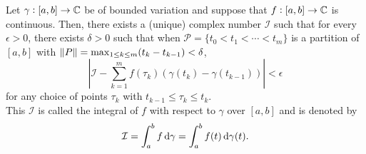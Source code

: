 		\begin{ftheo}
			Let $\gamma : [a,b] \to \mathbb{C}$ be of bounded variation and suppose that $f : [a,b] \to \mathbb{C}$ is continuous. Then, there exists a (unique) complex number $\mathcal{I}$ such that for every $\epsilon > 0$, there exists $\delta > 0$ such that when $\mathcal{P} = \{ t_0 < t_1 < \cdots < t_m \}$ is a partition of $[a,b]$ with $\left\lVert P\right\rVert = \max_{1 \le k \le m} (t_k - t_{k-1}) < \delta$,
			\[ \left| \mathcal{I} - \sum_{k=1}^m f(\tau_k) (\gamma(t_k) - \gamma(t_{k-1})) \right| < \epsilon \]
			for any choice of points $\tau_k$ with $t_{k-1} \le \tau_k \le t_k$.\\
			This $\mathcal{I}$ is called the integral of $f$ with respect to $\gamma$ over $[a,b]$ and is denoted by
			\[ \mathcal{I} = \int_a^b f \dif \gamma = \int_a^b f(t) \dif\gamma(t). \]
		\end{ftheo}
